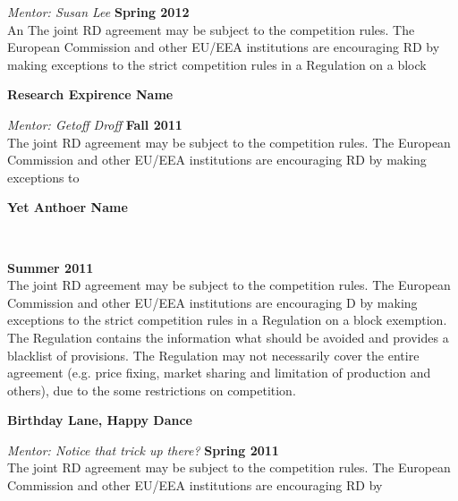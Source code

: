\documentclass[margin,line]{resume}
\begin{document}
\begin{resume}
\textsl{Mentor: Susan Lee} \hfill \textbf{Spring 2012}\\ An The joint RD agreement may be subject to the competition rules. The European Commission and other EU/EEA institutions are encouraging RD by making exceptions to the strict competition rules in a Regulation on a block


\textbf{Research Expirence Name} \vspace{0mm}\\\vspace{1mm}%

\textsl{Mentor: Getoff Droff} \hfill \textbf{Fall 2011}\\ The joint RD agreement may be subject to the competition rules. The European Commission and other EU/EEA institutions are encouraging RD by making exceptions to

\textbf{Yet Anthoer Name}

\vspace{0mm}\\\vspace{1mm}%

\textbf{Summer 2011}\\

The joint RD agreement may be subject to the competition rules. The European Commission and other EU/EEA institutions are encouraging D by making exceptions to the strict competition rules in a Regulation on a block exemption. The Regulation contains the information what should be avoided and provides a blacklist of provisions. The Regulation may not necessarily cover the entire agreement (e.g. price fixing, market sharing and limitation of production and others), due to the some restrictions on competition.


\textbf{Birthday Lane, Happy Dance} \vspace{0mm}\\\vspace{1mm}%

\textsl{Mentor: Notice that trick up there?} \hfill \textbf{Spring 2011}\\

The joint RD agreement may be subject to the competition rules. The European Commission and other EU/EEA institutions are encouraging RD by





\end{resume}
\end{document}

